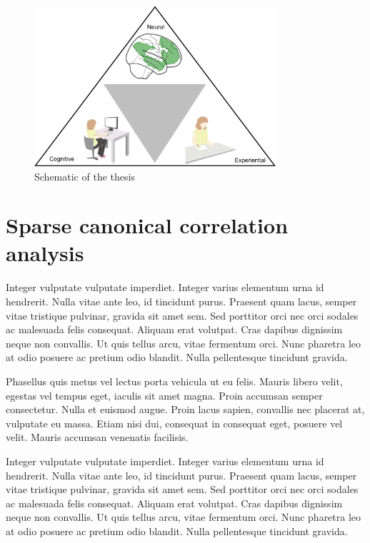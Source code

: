 \begin{figure}[H]
	\centering
	\includegraphics[width=0.8\textwidth]{chapters/img/thesisfig1.png}
	\caption{Schematic of the thesis} 
	\label{fig:thesis:fig1}
\end{figure}

\section{Sparse canonical correlation analysis}

Integer vulputate vulputate imperdiet. Integer varius elementum urna id hendrerit. Nulla vitae ante leo, id tincidunt purus. Praesent quam lacus, semper vitae tristique pulvinar, gravida sit amet sem. Sed porttitor orci nec orci sodales ac malesuada felis consequat. Aliquam erat volutpat. Cras dapibus dignissim neque non convallis. Ut quis tellus arcu, vitae fermentum orci. Nunc pharetra leo at odio posuere ac pretium odio blandit. Nulla pellentesque tincidunt gravida. 

Phasellus quis metus vel lectus porta vehicula ut eu felis. Mauris libero velit, egestas vel tempus eget, iaculis sit amet magna. Proin accumsan semper consectetur. Nulla et euismod augue. Proin lacus sapien, convallis nec placerat at, vulputate eu massa. Etiam nisi dui, consequat in consequat eget, posuere vel velit. Mauris accumsan venenatis facilisis.

Integer vulputate vulputate imperdiet. Integer varius elementum urna id hendrerit. Nulla vitae ante leo, id tincidunt purus. Praesent quam lacus, semper vitae tristique pulvinar, gravida sit amet sem. Sed porttitor orci nec orci sodales ac malesuada felis consequat. Aliquam erat volutpat. Cras dapibus dignissim neque non convallis. Ut quis tellus arcu, vitae fermentum orci. Nunc pharetra leo at odio posuere ac pretium odio blandit. Nulla pellentesque tincidunt gravida. 

